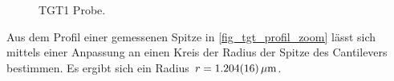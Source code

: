 \documentclass[
	a4paper,
	12pt,
	pagesize,
	ngerman
]{scrartcl}
\begin{document}
\begin{figure}[H]
			\caption{TGT1 Probe.}
			\label{fig_tgt}
\end{figure}

Aus dem Profil einer gemessenen Spitze in \cref{fig_tgt_profil_zoom} lässt sich mittels einer Anpassung an einen Kreis der Radius der Spitze des Cantilevers bestimmen.
Es ergibt sich ein Radius $r=\SI{1.204 +-0.016}{\mu m}$.
\end{document}
